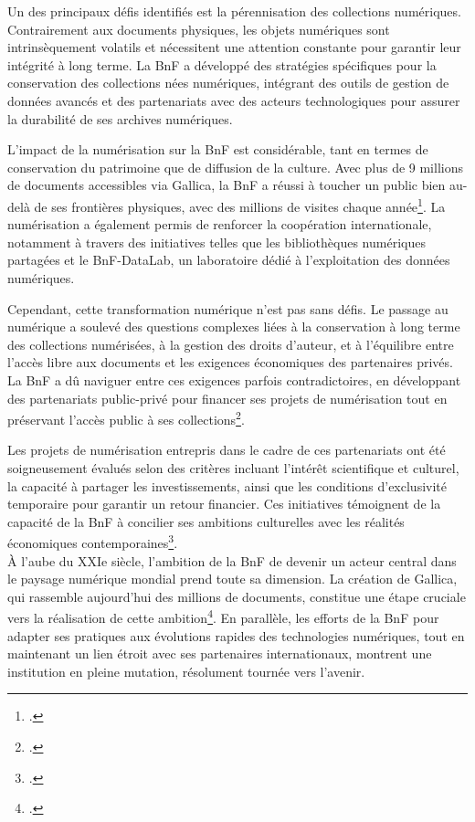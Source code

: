 \documentclass[a4paper,12pt,twoside]{book}
\begin{document}
	Un des principaux défis identifiés est la pérennisation des collections numériques. Contrairement aux documents physiques, les objets numériques sont intrinsèquement volatils et nécessitent une attention constante pour garantir leur intégrité à long terme. La BnF a développé des stratégies spécifiques pour la conservation des collections nées numériques, intégrant des outils de gestion de données avancés et des partenariats avec des acteurs technologiques pour assurer la durabilité de ses archives numériques.
	
	L’impact de la numérisation sur la BnF est considérable, tant en termes de conservation du patrimoine que de diffusion de la culture. Avec plus de 9 millions de documents accessibles via Gallica, la BnF a réussi à toucher un public bien au-delà de ses frontières physiques, avec des millions de visites chaque année\footcite{engel_numerique_2022}. La numérisation a également permis de renforcer la coopération internationale, notamment à travers des initiatives telles que les bibliothèques numériques partagées et le BnF-DataLab, un laboratoire dédié à l’exploitation des données numériques.
	
	Cependant, cette transformation numérique n’est pas sans défis. Le passage au numérique a soulevé des questions complexes liées à la conservation à long terme des collections numérisées, à la gestion des droits d’auteur, et à l’équilibre entre l’accès libre aux documents et les exigences économiques des partenaires privés. La BnF a dû naviguer entre ces exigences parfois contradictoires, en développant des partenariats public-privé pour financer ses projets de numérisation tout en préservant l’accès public à ses collections\footcite{bruckmann_numerisation_2012}.
	
	Les projets de numérisation entrepris dans le cadre de ces partenariats ont été soigneusement évalués selon des critères incluant l’intérêt scientifique et culturel, la capacité à partager les investissements, ainsi que les conditions d’exclusivité temporaire pour garantir un retour financier. Ces initiatives témoignent de la capacité de la BnF à concilier ses ambitions culturelles avec les réalités économiques contemporaines\footcite{bruckmann_numerisation_2012}.
	\\

	À l’aube du XXIe siècle, l’ambition de la BnF de devenir un acteur central dans le paysage numérique mondial prend toute sa dimension. La création de Gallica, qui rassemble aujourd’hui des millions de documents, constitue une étape cruciale vers la réalisation de cette ambition\footcite{racine_bibliotheque_2011}. En parallèle, les efforts de la BnF pour adapter ses pratiques aux évolutions rapides des technologies numériques, tout en maintenant un lien étroit avec ses partenaires internationaux, montrent une institution en pleine mutation, résolument tournée vers l’avenir.
	
\end{document}
